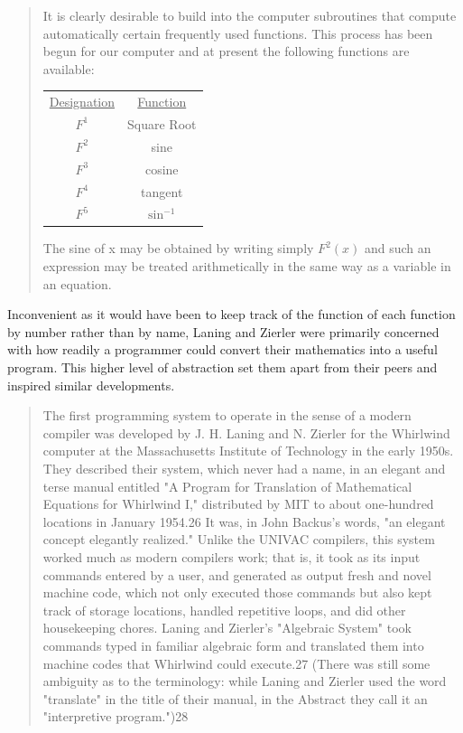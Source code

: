 \begin{quotation}
	It is clearly desirable to build into the computer subroutines
	that compute automatically certain frequently used functions. This
	process has been begun for our computer and at present the following
	functions are available:
	\\
	\begin{center}
		\begin{tabular}{|c|c|}
			\hline
			\underline{Designation} & \underline{Function} \\
			$F^1$                   & Square Root          \\
			$F^2$                   & sine                 \\
			$F^3$                   & cosine               \\
			$F^4$                   & tangent              \\
			$F^5$                   & $\sin^{-1}$          \\
			\hline
		\end{tabular}
	\end{center}

	The sine of x may be obtained by writing simply $F^{2}(x)$ and
	such an expression may be treated arithmetically in the same way
	as a variable in an equation.
\end{quotation}

Inconvenient as it would have been to keep track of the function of each function
by number rather than by name, Laning and Zierler were primarily concerned with
how readily a programmer could convert their mathematics into a useful program.
This higher level of abstraction set them apart from their peers and inspired
similar developments.

\begin{quotation}
	The first programming system to operate in the sense of a modern compiler was
	developed by J. H. Laning and N. Zierler for the Whirlwind computer at the
	Massachusetts Institute of Technology in the early 1950s. They described their
	system, which never had a name, in an elegant and terse manual entitled "A
	Program for Translation of Mathematical Equations for Whirlwind I,"
	distributed
	by MIT to about one-hundred locations in January 1954.26 It was, in John
	Backus's words, "an elegant concept elegantly realized." Unlike the UNIVAC
	compilers, this system worked much as modern compilers work; that is, it took
	as its input commands entered by a user, and generated as output fresh and
	novel machine code, which not only executed those commands but also kept track
	of storage locations, handled repetitive loops, and did other housekeeping
	chores. Laning and Zierler's "Algebraic System" took commands typed
	in familiar
	algebraic form and translated them into machine codes that Whirlwind could
	execute.27 (There was still some ambiguity as to the terminology: while Laning
	and Zierler used the word "translate" in the title of their manual, in the
	Abstract they call it an "interpretive program.")28
	\cite{new-history-of-modern-computing}
\end{quotation}


